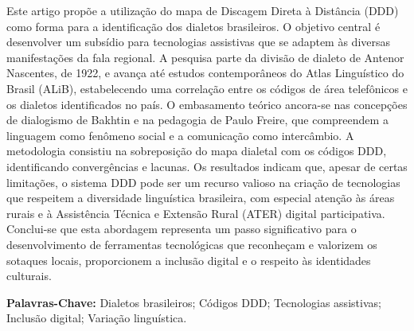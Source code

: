 	\begin{resumo}

 Este artigo propõe a utilização do mapa de Discagem Direta à Distância (DDD) como forma para a identificação dos dialetos brasileiros. O objetivo central é desenvolver um subsídio para tecnologias assistivas que se adaptem às diversas manifestações da fala regional. A pesquisa parte da divisão de dialeto de Antenor Nascentes, de 1922, e avança até estudos contemporâneos do Atlas Linguístico do Brasil (ALiB), estabelecendo uma correlação entre os códigos de área telefônicos e os dialetos identificados no país. O embasamento teórico ancora-se nas concepções de dialogismo de Bakhtin e na pedagogia de Paulo Freire, que compreendem a linguagem como fenômeno social e a comunicação como intercâmbio. A metodologia consistiu na sobreposição do mapa dialetal com os códigos DDD, identificando convergências e lacunas. Os resultados indicam que, apesar de certas limitações, o sistema DDD pode ser um recurso valioso na criação de tecnologias que respeitem a diversidade linguística brasileira, com especial atenção às áreas rurais e à Assistência Técnica e Extensão Rural (ATER) digital participativa. Conclui-se que esta abordagem representa um passo significativo para o desenvolvimento de ferramentas tecnológicas que reconheçam e valorizem os sotaques locais, proporcionem a inclusão digital e o respeito às identidades culturais. 
\\[0.5em]

		
		\vspace*{0.5cm}
		
		\noindent\textbf{{Palavras-Chave: }}  Dialetos brasileiros; Códigos DDD; Tecnologias assistivas; Inclusão digital; Variação linguística.

		
	\end{resumo}
	
	
